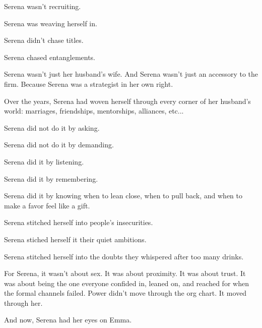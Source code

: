 Serena wasn’t recruiting.  

Serena was weaving herself in.

Serena didn’t chase titles. 

Serena chased entanglements.  

Serena wasn’t just her husband’s wife. 
And Serena wasn’t just an accessory to the firm.  
Because Serena was a strategist in her own right. 

Over the years, Serena had woven herself through every corner of her husband’s world:  
marriages, friendships, mentorships, alliances, etc...  

Serena did not do it by asking. 

Serena did not do it by demanding.  

Serena did it by listening. 

Serena did it by remembering. 

Serena did it by knowing when to lean close, when to pull back, and when to make a favor feel like a gift.

Serena stitched herself into people’s insecurities. 

Serena stiched herself it their quiet ambitions. 

Serena stitched herself into the doubts they whispered after too many drinks.  

For Serena, it wasn’t about sex.  
It was about proximity.  
It was about trust.  
It was about being the one everyone confided in, 
leaned on, and reached for when the formal channels failed.
Power didn’t move through the org chart.  
It moved through her.  

And now, Serena had her eyes on Emma.

\medskip


